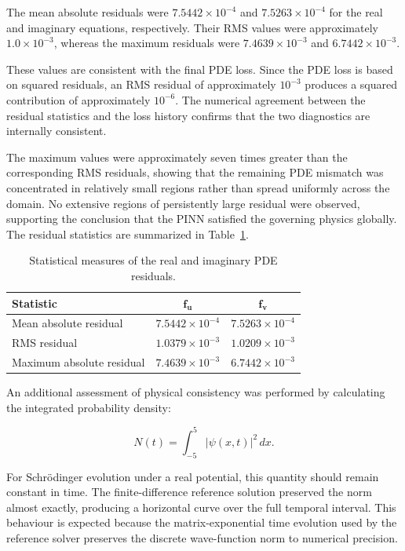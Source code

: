 \documentclass[11pt]{article}
\begin{document}
The mean absolute residuals were \(7.5442\times10^{-4}\) and \(7.5263\times10^{-4}\) for the 
real and imaginary equations, respectively. Their RMS values were approximately \(1.0\times10^{-3}\), 
whereas the maximum residuals were \(7.4639\times10^{-3}\) and \(6.7442\times10^{-3}\).

These values are consistent with the final PDE loss. Since the PDE loss is based on squared 
residuals, an RMS residual of approximately \(10^{-3}\) produces a squared contribution of 
approximately \(10^{-6}\). The numerical agreement between the residual statistics and the 
loss history confirms that the two diagnostics are internally consistent.

The maximum values were approximately seven times greater than the corresponding RMS 
residuals, showing that the remaining PDE mismatch was concentrated in relatively small 
regions rather than spread uniformly across the domain. No extensive regions of persistently 
large residual were observed, supporting the conclusion that the PINN satisfied the governing 
physics globally. The residual statistics are summarized in Table~\ref{tab:residual_statistics}.

\begin{table}[htbp]
\centering
\caption{Statistical measures of the real and imaginary PDE residuals.}
\label{tab:residual_statistics}
\begin{tabular}{lcc}
\hline
\textbf{Statistic} & \(\boldsymbol{f_u}\) & \(\boldsymbol{f_v}\) \\
\hline
Mean absolute residual
& \(7.5442\times10^{-4}\)
& \(7.5263\times10^{-4}\) \\

RMS residual
& \(1.0379\times10^{-3}\)
& \(1.0209\times10^{-3}\) \\

Maximum absolute residual
& \(7.4639\times10^{-3}\)
& \(6.7442\times10^{-3}\) \\
\hline
\end{tabular}

\end{table}


An additional assessment of physical consistency was performed 
by calculating the integrated probability density:

\begin{equation}
N(t)
=
\int_{-5}^{5}
|\psi(x,t)|^2\,dx.
\end{equation}

For Schrödinger evolution under a real potential, this quantity 
should remain constant in time. The finite-difference reference 
solution preserved the norm almost exactly, producing a horizontal 
curve over the full temporal interval. This behaviour is expected 
because the matrix-exponential time evolution used by the reference 
solver preserves the discrete wave-function norm to numerical precision.
\end{document}

